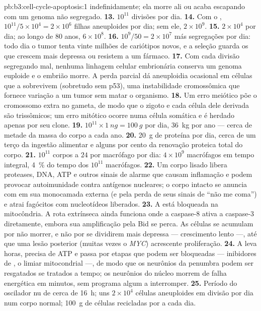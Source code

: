 \begin{solution}{pb:b3:cell-cycle-apoptosis:1}
indefinidamente; ela morre ali ou acaba escapando com um genoma não
segregado.
\textbf{13.} $10^{11}$ divisões por dia.
\textbf{14.} Com o , $10^{11}/5\times 10^{4} = 2\times 10^{6}$ filhas aneuploides por dia; sem ele, $2\times 10^{9}$.
\textbf{15.} $2\times 10^{4}$ por dia; ao longo de $80$ anos,
$6\times 10^{8}$.
\textbf{16.} $10^{9}/50 = 2\times 10^{7}$ más segregações por dia: todo
dia o tumor tenta vinte milhões de cariótipos novos, e a seleção guarda
os que crescem mais depressa ou resistem a um fármaco.
\textbf{17.} Com cada divisão segregando mal, nenhuma linhagem celular
embrionária conserva um genoma euploide e o embrião morre. A perda
parcial dá aneuploidia ocasional em células que a sobrevivem (sobretudo
sem p53), uma instabilidade cromossômica que fornece variação a um
tumor sem matar o organismo.
\textbf{18.} Um erro meiótico põe o cromossomo extra no gameta, de modo
que o zigoto e cada célula dele derivada são trissômicos; um erro
mitótico ocorre numa célula somática e é herdado apenas por seu clone.
\textbf{19.} $10^{11}\times \qty{1}{ng} = \qty{100}{g}$ por dia,
\qty{36}{kg} por ano --- cerca de metade da massa do corpo a cada ano.
\textbf{20.} \qty{20}{g} de proteína por dia, cerca de um terço da
ingestão alimentar e alguns por cento da renovação proteica total do
corpo.
\textbf{21.} $10^{11}$ corpos a $24$ por macrófago por dia: $4\times
10^{9}$ macrófagos em tempo integral, \qty{4}{\%} do tempo dos
$10^{11}$ macrófagos.
\textbf{22.} Um corpo lisado libera proteases, DNA, ATP e outros sinais
de alarme que causam inflamação e podem provocar autoimunidade contra
antígenos nucleares; o corpo intacto se anuncia com  em
sua monocamada externa (e pela perda de seus sinais de ``não me coma'')
e atrai fagócitos com nucleotídeos liberados.
\textbf{23.} A  está bloqueada na mitocôndria. A rota
extrínseca ainda funciona onde a caspase-8 ativa a caspase-3
diretamente, embora sua amplificação pela Bid se perca. As células se
acumulam por não morrer, e não por se dividirem mais depressa ---
crescimento lento ---, até que uma lesão posterior (muitas vezes o
\emph{MYC}) acrescente proliferação.
\textbf{24.} A  leva horas, precisa de ATP e passa por etapas
que podem ser bloqueadas --- inibidores de , o limiar
mitocondrial ---, de modo que os neurônios da penumbra podem ser
resgatados se tratados a tempo; os neurônios do núcleo morrem de falha
energética em minutos, sem programa algum a interromper.
\textbf{25.} Período do oscilador nu de cerca de \qty{16}{h}; uns
$2\times
10^{4}$ células aneuploides em divisão por dia num corpo
normal; \qty{100}{g} de células recicladas por  a cada dia.
\end{solution}
